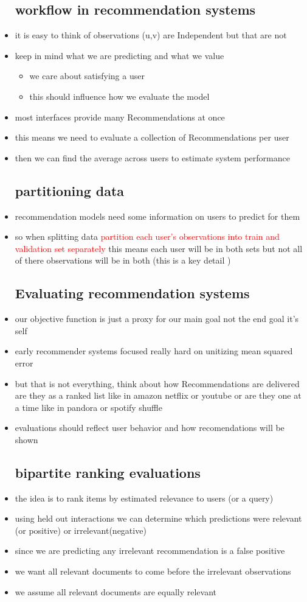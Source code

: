 \documentclass{article}
\begin{document}
\begin{itemize}
\subsection*{workflow in recommendation systems}
\item it is easy to think of observations (u,v) are Independent but that are not 
\item keep in mind what we are predicting and what we value 
\begin{itemize}
    \item we care about satisfying a user 
    \item this should influence how we evaluate the model
\end{itemize}
\item most interfaces provide many Recommendations at once 
\item this means we need to evaluate a collection of Recommendations per user 
\item then we can find the average across users to estimate system performance 
\subsection*{partitioning data }

\item recommendation models need some information on users to predict for them 
\item so when splitting data \textcolor{red}{partition each user's observations into train and validation set separately} this means each user will be in both sets but not all of there observations will be in both (this is a key detail )
\subsection*{Evaluating recommendation systems}
\item our objective function is just a proxy for our main goal not the end goal it's self 
\item early recommender systems focused really hard on unitizing mean squared error
\item but that is not everything, think about how Recommendations are delivered are they as a ranked list like in amazon netflix or youtube or are they one at a time like in pandora or spotify shuffle 
\item evaluations should reflect user behavior and how recomendations will be shown 
\subsection*{bipartite ranking evaluations}
\item the idea is to rank items by estimated relevance to users (or a query)
\item using held out interactions we can determine which predictions were relevant (or positive) or irrelevant(negative)
\item since we are predicting any irrelevant recommendation is a false positive
\item we want all relevant documents to come before the irrelevant observations
\item we assume all relevant documents are equally relevant

\end{itemize}
\end{document}
